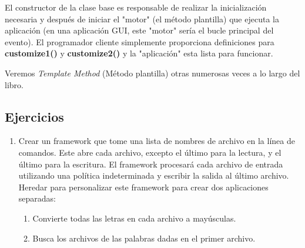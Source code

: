 El constructor de la clase base es responsable de realizar la inicialización necesaria y después de iniciar el "motor" (el método plantilla) que ejecuta la aplicación (en una aplicación GUI, este "motor" sería el
bucle principal del evento). El programador cliente simplemente proporciona definiciones para \textbf{customize1()}  y \textbf{customize2()} y la "aplicación" esta lista para funcionar.     \newline

Veremos \textit{Template Method} (Método plantilla) otras numerosas veces a lo largo del libro.

\subsection*{Ejercicios}
\label{subsec:exercises}

\begin{enumerate}[1.]
    \item Crear un framework que tome una lista de nombres de archivo en la línea de comandos. Este abre cada archivo, excepto el último para la lectura, y el último para la escritura. El framework procesará cada archivo de entrada utilizando una política indeterminada y escribir la salida al último archivo. Heredar para personalizar este framework para crear dos aplicaciones separadas:
    \begin{enumerate}[1)]
        \item Convierte todas las letras en cada archivo a mayúsculas.
        \item Busca los archivos de las palabras dadas en el primer archivo.
    \end{enumerate}
\end{enumerate}
